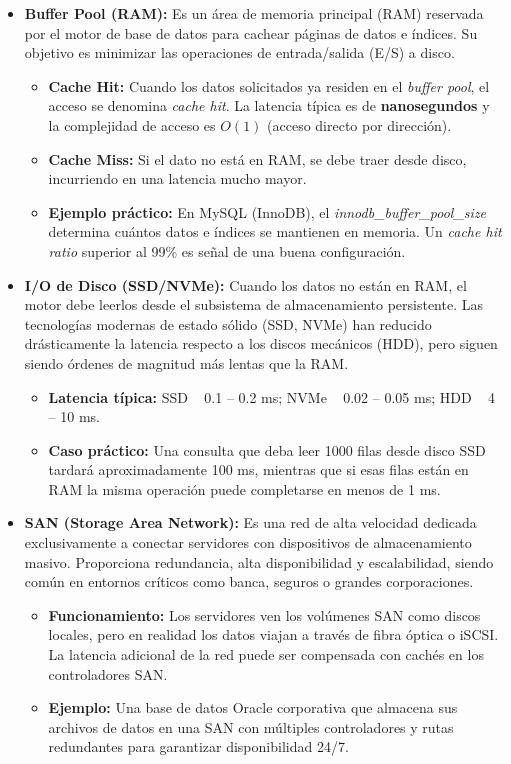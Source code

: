 \documentclass[12pt,a4paper,openany,oneside]{book}
\begin{document}
\begin{itemize}
    \item \textbf{Buffer Pool (RAM):} Es un área de memoria principal (RAM) reservada por el motor de base de datos para cachear páginas de datos e índices. Su objetivo es minimizar las operaciones de entrada/salida (E/S) a disco.
    \begin{itemize}
        \item \textbf{Cache Hit:} Cuando los datos solicitados ya residen en el \textit{buffer pool}, el acceso se denomina \textit{cache hit}. La latencia típica es de \textbf{nanosegundos} y la complejidad de acceso es $O(1)$ (acceso directo por dirección).
        \item \textbf{Cache Miss:} Si el dato no está en RAM, se debe traer desde disco, incurriendo en una latencia mucho mayor.
        \item \textbf{Ejemplo práctico:} En MySQL (InnoDB), el \textit{innodb\_buffer\_pool\_size} determina cuántos datos e índices se mantienen en memoria. Un \textit{cache hit ratio} superior al 99\% es señal de una buena configuración.
    \end{itemize}
    
    \item \textbf{I/O de Disco (SSD/NVMe):} Cuando los datos no están en RAM, el motor debe leerlos desde el subsistema de almacenamiento persistente. Las tecnologías modernas de estado sólido (SSD, NVMe) han reducido drásticamente la latencia respecto a los discos mecánicos (HDD), pero siguen siendo órdenes de magnitud más lentas que la RAM.
    \begin{itemize}
        \item \textbf{Latencia típica:} SSD ~ 0.1 -- 0.2 ms; NVMe ~ 0.02 -- 0.05 ms; HDD ~ 4 -- 10 ms.
        \item \textbf{Caso práctico:} Una consulta que deba leer 1000 filas desde disco SSD tardará aproximadamente 100 ms, mientras que si esas filas están en RAM la misma operación puede completarse en menos de 1 ms.
    \end{itemize}
    
    \item \textbf{SAN (Storage Area Network):} Es una red de alta velocidad dedicada exclusivamente a conectar servidores con dispositivos de almacenamiento masivo. Proporciona redundancia, alta disponibilidad y escalabilidad, siendo común en entornos críticos como banca, seguros o grandes corporaciones.
    \begin{itemize}
        \item \textbf{Funcionamiento:} Los servidores ven los volúmenes SAN como discos locales, pero en realidad los datos viajan a través de fibra óptica o iSCSI. La latencia adicional de la red puede ser compensada con cachés en los controladores SAN.
        \item \textbf{Ejemplo:} Una base de datos Oracle corporativa que almacena sus archivos de datos en una SAN con múltiples controladores y rutas redundantes para garantizar disponibilidad 24/7.
    \end{itemize}
\end{itemize}
\end{document}
